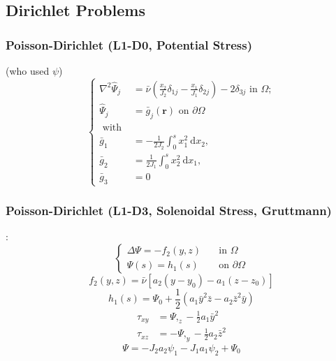



\subsection{Dirichlet Problems}
\subsubsection{Poisson-Dirichlet (L1-D0, Potential Stress)}
\cite{lacarbonara2007solution} (who used \(\psi\))
\begin{equation}
\left\{
\begin{aligned}
\nabla^2 \hat{\Psi}_j&=\bar{\nu}\left(\frac{x_2}{J_2} \delta_{1 j}-\frac{x_1}{J_1} \delta_{2 j}\right)-2 \delta_{3 j} \text { in } \Omega ; \\
\hat{\Psi}_j&=\bar{g}_j(\bm{r}) \text { on } \partial \Omega\\
\text { with }&\\
\bar{g}_1&=-\frac{1}{2 J_2} \int_0^s x_1^2 \mathrm{~d} x_2, \\
\bar{g}_2&=\frac{1}{2 J_1} \int_0^s x_2^2 \mathrm{~d} x_1, \\
\bar{g}_3&=0
\end{aligned}
\right.
\end{equation}

\subsubsection{Poisson-Dirichlet (L1-D3, Solenoidal Stress, Gruttmann)}
\cite{gruttmann1999shear}:
\begin{equation}
\left\{
\begin{aligned}
\Delta \Psi=-f_2(y, z) \quad &\text{in } \Omega \\ \Psi(s)=h_1(s) \quad &\text{on } \partial \Omega
\end{aligned}
\right.
\end{equation}
\begin{equation*}
f_2(y, z)=\bar{\nu}\left[a_2\left(y-y_0\right)-a_1\left(z-z_0\right)\right]
\end{equation*}
\begin{equation*}
h_1(s)=\Psi_0+\frac{1}{2}\left(a_1 \bar{y}^2 \bar{z}-a_2 \bar{z}^2 \bar{y}\right)
\end{equation*}
\begin{equation*}
\begin{aligned}
\tau_{x y} & = \Psi,_z-\frac{1}{2} a_1 \bar{y}^2 \\
\tau_{x z} & =-\Psi,_y-\frac{1}{2} a_2 \bar{z}^2
\end{aligned}
\end{equation*}
\begin{equation}
\Psi=-J_2 a_2 \psi_1-J_1 a_1 \psi_2+\Psi_0
\end{equation}

